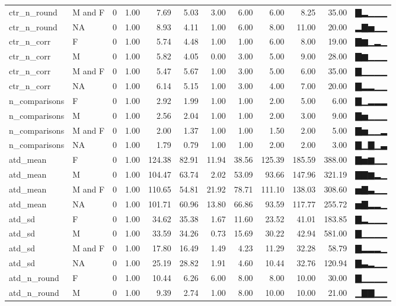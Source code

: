 \documentclass[
]{article}
\begin{document}
\begin{longtable}[]{@{}llrrrrrrrrrl@{}}
ctr\_n\_round & M and F & 0 & 1.00 & 7.69 & 5.03 & 3.00 & 6.00 & 6.00 &
8.25 & 35.00 & ▇▂▁▁▁ \\
ctr\_n\_round & NA & 0 & 1.00 & 8.93 & 4.11 & 1.00 & 6.00 & 8.00 & 11.00
& 20.00 & ▂▇▅▁▁ \\
ctr\_n\_corr & F & 0 & 1.00 & 5.74 & 4.48 & 1.00 & 1.00 & 6.00 & 8.00 &
19.00 & ▇▆▁▂▁ \\
ctr\_n\_corr & M & 0 & 1.00 & 5.82 & 4.05 & 0.00 & 3.00 & 5.00 & 9.00 &
28.00 & ▇▆▁▁▁ \\
ctr\_n\_corr & M and F & 0 & 1.00 & 5.47 & 5.67 & 1.00 & 3.00 & 5.00 &
6.00 & 35.00 & ▇▁▁▁▁ \\
ctr\_n\_corr & NA & 0 & 1.00 & 6.14 & 5.15 & 1.00 & 3.00 & 4.00 & 7.00 &
20.00 & ▇▂▂▁▁ \\
n\_comparisons & F & 0 & 1.00 & 2.92 & 1.99 & 1.00 & 1.00 & 2.00 & 5.00
& 6.00 & ▇▁▂▂▂ \\
n\_comparisons & M & 0 & 1.00 & 2.56 & 2.04 & 1.00 & 1.00 & 2.00 & 3.00
& 9.00 & ▇▅▁▁▁ \\
n\_comparisons & M and F & 0 & 1.00 & 2.00 & 1.37 & 1.00 & 1.00 & 1.50 &
2.00 & 5.00 & ▇▅▁▁▂ \\
n\_comparisons & NA & 0 & 1.00 & 1.79 & 0.79 & 1.00 & 1.00 & 2.00 & 2.00
& 3.00 & ▇▁▇▁▃ \\
atd\_mean & F & 0 & 1.00 & 124.38 & 82.91 & 11.94 & 38.56 & 125.39 &
185.59 & 388.00 & ▇▅▆▁▁ \\
atd\_mean & M & 0 & 1.00 & 104.47 & 63.74 & 2.02 & 53.09 & 93.66 &
147.96 & 321.19 & ▇▇▆▂▁ \\
atd\_mean & M and F & 0 & 1.00 & 110.65 & 54.81 & 21.92 & 78.71 & 111.10
& 138.03 & 308.60 & ▅▇▃▁▁ \\
atd\_mean & NA & 0 & 1.00 & 101.71 & 60.96 & 13.80 & 66.86 & 93.59 &
117.77 & 255.72 & ▅▇▂▂▁ \\
atd\_sd & F & 0 & 1.00 & 34.62 & 35.38 & 1.67 & 11.60 & 23.52 & 41.01 &
183.85 & ▇▂▁▁▁ \\
atd\_sd & M & 0 & 1.00 & 33.59 & 34.26 & 0.73 & 15.69 & 30.22 & 42.94 &
581.00 & ▇▁▁▁▁ \\
atd\_sd & M and F & 0 & 1.00 & 17.80 & 16.49 & 1.49 & 4.23 & 11.29 &
32.28 & 58.79 & ▇▂▂▂▁ \\
atd\_sd & NA & 0 & 1.00 & 25.19 & 28.82 & 1.91 & 4.60 & 10.44 & 32.76 &
120.94 & ▇▃▂▁▁ \\
atd\_n\_round & F & 0 & 1.00 & 10.44 & 6.26 & 6.00 & 8.00 & 8.00 & 10.00
& 30.00 & ▇▁▁▁▁ \\
atd\_n\_round & M & 0 & 1.00 & 9.39 & 2.74 & 1.00 & 8.00 & 10.00 & 10.00
& 21.00 & ▁▇▇▁▁ \\

\end{longtable}
\end{document}
